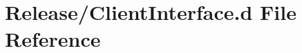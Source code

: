 \hypertarget{Release_2ClientInterface_8d}{}\section{Release/\+Client\+Interface.d File Reference}
\label{Release_2ClientInterface_8d}
